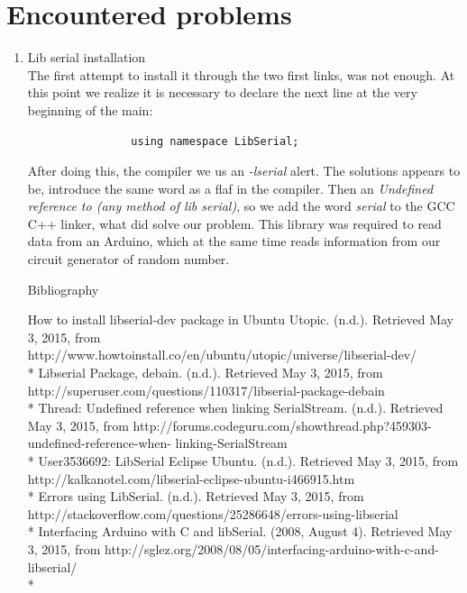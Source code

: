 \documentclass[twocolumn]{IEEEtran}
\begin{document}
\section{Encountered problems}
\begin{enumerate}
	\item Lib serial installation\\
    The first attempt to install it through the two first links, was not enough. At this 
    point we realize it is necessary to declare the next line at the very beginning of 
    the main:
    \begin{center}
 	   \begin{verbatim}
			    using namespace LibSerial;
		\end{verbatim}

	\end{center}
 	After doing this, the compiler we us an \textit{-lserial} alert. The solutions 
    appears to be, introduce the same word as a flaf in the compiler. Then an \textit{ 
    Undefined reference to (any method of lib serial)}, so we add the word 
    \textit{serial} to the GCC C++ linker, what did solve our problem. This library was 
    required to read data from an Arduino, which at the same time reads information from 
    our circuit generator of random number.\\

	\begin{center}
    Bibliography
    \end{center}
	How to install libserial-dev package in Ubuntu Utopic. (n.d.). Retrieved May 3, 
    2015, from http://www.howtoinstall.co/en/ubuntu/utopic/universe/libserial-dev/ \\*
    Libserial Package, debain. (n.d.). Retrieved May 3, 2015, from
    http://superuser.com/questions/110317/libserial-package-debain  \\*
    Thread: Undefined reference when linking SerialStream. (n.d.). Retrieved May 3, 
    2015, from http://forums.codeguru.com/showthread.php?459303-undefined-reference-when-
    linking-SerialStream \\*
    User3536692: LibSerial Eclipse Ubuntu. (n.d.). Retrieved May 3, 2015, from 
    http://kalkanotel.com/libserial-eclipse-ubuntu-i466915.htm \\*
    Errors using LibSerial. (n.d.). Retrieved May 3, 2015, from 
    http://stackoverflow.com/questions/25286648/errors-using-libserial \\*
    Interfacing Arduino with C and libSerial. (2008, August 4). Retrieved May 3, 
    2015, from http://sglez.org/2008/08/05/interfacing-arduino-with-c-and-libserial/ \\*
    

\end{enumerate}
\end{document}
